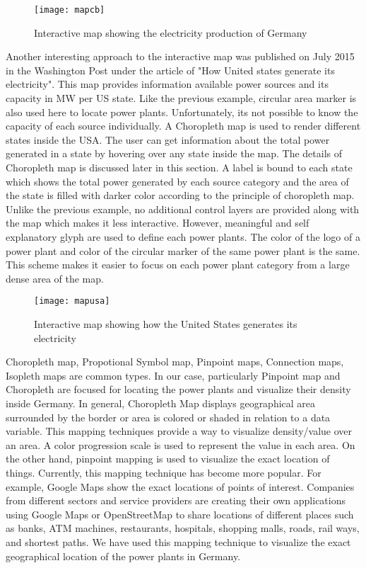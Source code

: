 \begin{figure}
  \begin{center}
    \texttt{[image: mapcb]}
    \caption{Interactive map showing the electricity production of Germany}
    \label{fig:mapcb}
  \end{center}
\end{figure}

Another interesting approach to the interactive map was published on July 2015 in the Washington Post \cite{wp2015} under the article of "How United states generate its electricity". This map provides information available power sources and its capacity in MW per US state. Like the previous example, circular area marker is also used here to locate power plants. Unfortunately, its not possible to know the capacity of each source individually. A Choropleth map is used to render different states inside the USA. The user can get information about the total power generated in a state by hovering over any state inside the map. The details of Choropleth map is discussed later in this section. A label is bound to each state which shows the total power generated by each source category and the area of the state is filled with darker color according to the principle of choropleth map. Unlike the previous example, no additional control layers are provided along with the map which makes it less interactive. However, meaningful and self explanatory glyph are used to define each power plants. The color of the logo of a power plant and color of the circular marker of the same power plant is the same. This scheme makes it easier to focus on each power plant category from a large dense area of the map.

\begin{figure}
  \begin{center}
    \texttt{[image: mapusa]}
    \caption{Interactive map showing how the United States generates its electricity}
    \label{fig:mapusa}
  \end{center}
\end{figure}

Choropleth map, Propotional Symbol map, Pinpoint maps, Connection maps, Isopleth maps are common types. In our case, particularly Pinpoint map and Choropleth are focused for locating the power plants and visualize their density inside Germany. In general, Choropleth Map displays geographical area surrounded by the border or area is colored or shaded in relation to a data variable. This mapping techniques provide a way to visualize density/value over an area. A color progression scale is used to represent the value in each area. On the other hand, pinpoint mapping is used to visualize the exact location of things. Currently, this mapping technique has become more popular. For example, Google Maps show the exact locations of points of interest. Companies from different sectors and service providers are creating their own applications using Google Maps or OpenStreetMap to share locations of different places such as banks, ATM machines, restaurants, hospitals, shopping malls, roads, rail ways, and shortest paths. We have used this mapping technique to visualize the exact geographical location of the power plants in Germany.

